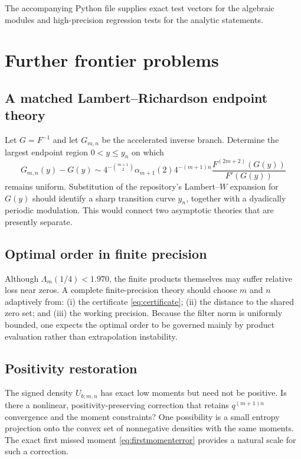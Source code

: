 \documentclass[11pt]{article}
\theoremstyle{definition}
\theoremstyle{remark}
\begin{document}
The accompanying Python file supplies exact test vectors for the algebraic
modules and high-precision regression tests for the analytic statements.

\section{Further frontier problems}
\label{sec:open}

\subsection{A matched Lambert--Richardson endpoint theory}

Let \(G=F^{-1}\) and let \(G_{m,n}\) be the accelerated inverse branch. Determine
the largest endpoint region \(0<y\leq y_n\) on which
\[
 G_{m,n}(y)-G(y)
 \sim 4^{-\binom{m+1}{2}}\alpha_{m+1}(2)4^{-(m+1)n}
 \frac{F^{(2m+2)}(G(y))}{F'(G(y))}
\]
remains uniform. Substitution of the repository's Lambert--\(W\) expansion for
\(G(y)\) should identify a sharp transition curve \(y_n\), together with a
dyadically periodic modulation. This would connect two asymptotic theories that
are presently separate.

\subsection{Optimal order in finite precision}

Although \(\Lambda_m(1/4)<1.970\), the finite products themselves may suffer
relative loss near zeros. A complete finite-precision theory should choose
\(m\) and \(n\) adaptively from: (i) the certificate \eqref{eq:certificate};
(ii) the distance to the shared zero set; and (iii) the working precision.
Because the filter norm is uniformly bounded, one expects the optimal order to be
governed mainly by product evaluation rather than extrapolation instability.

\subsection{Positivity restoration}

The signed density \(U_{b;m,n}\) has exact low moments but need not be positive.
Is there a nonlinear, positivity-preserving correction that retains
\(q^{(m+1)n}\) convergence and the moment constraints? One possibility is a
small entropy projection onto the convex set of nonnegative densities with the
same moments. The exact first missed moment \eqref{eq:firstmomenterror} provides
a natural scale for such a correction.
\end{document}
